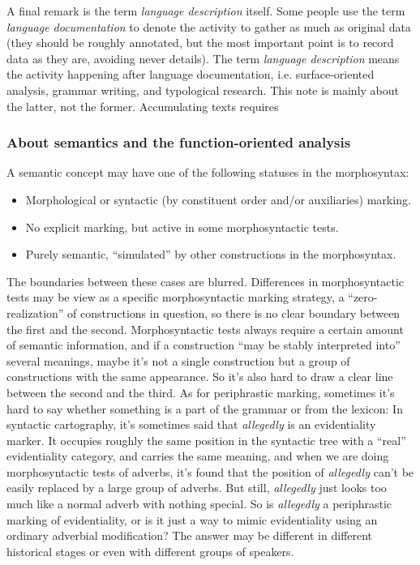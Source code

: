 \documentclass[UTF8, a4paper, oneside, scheme=plain]{ctexart}
\newcommand*{\term}[1]{\emph{#1}}
\newcommand*{\corpus}[1]{\emph{#1}}
\begin{document}
A final remark is the term \term{language description} itself.
Some people use the term \term{language documentation} to denote 
the activity to gather as much as original data 
(they should be roughly annotated, 
but the most important point is to record data as they are,
avoiding never details).
The term \term{language description} means the activity happening after language documentation,
i.e. surface-oriented analysis, grammar writing, and typological research.
This note is mainly about the latter, not the former.
Accumulating texts requires 

\subsubsection{About semantics and the function-oriented analysis}

A semantic concept may have one of the following statuses in the morphosyntax:
\begin{itemize}
    \item Morphological or syntactic (by constituent order and/or auxiliaries) marking.
    \item No explicit marking, but active in some morphosyntactic tests.
    \item Purely semantic, ``simulated'' by other constructions in the morphosyntax.
\end{itemize}

The boundaries between these cases are blurred.
Differences in morphosyntactic tests may be view as a specific morphosyntactic marking strategy,
a ``zero-realization'' of constructions in question,
so there is no clear boundary between the first and the second.
Morphosyntactic tests always require a certain amount of semantic information,
and if a construction ``may be stably interpreted into'' several meanings,
maybe it's not a single construction but a group of constructions with the same appearance.
So it's also hard to draw a clear line between the second and the third.
As for periphrastic marking, sometimes it's hard to say 
whether something is a part of the grammar or from the lexicon:
In syntactic cartography,
it's sometimes said that \corpus{allegedly} is an evidentiality marker.
It occupies roughly the same position in the syntactic tree with a ``real'' evidentiality category,
and carries the same meaning,
and when we are doing morphosyntactic tests of adverbs,
it's found that the position of \corpus{allegedly} can't 
be easily replaced by a large group of adverbs.
But still, \corpus{allegedly} just looks too much like a normal adverb with nothing special.
So is \corpus{allegedly} a periphrastic marking of evidentiality,
or is it just a way to mimic evidentiality using an ordinary adverbial modification?
The answer may be different in different historical stages or even with different groups of speakers.
\end{document}

